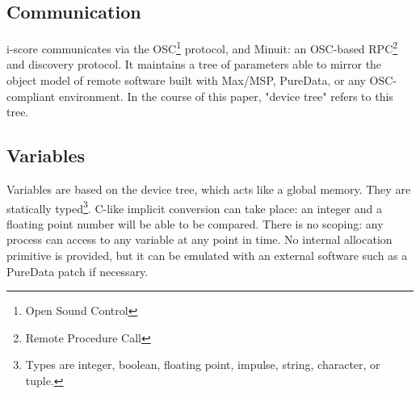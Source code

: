 \documentclass{article}
\begin{document}
\subsection{Communication}
i-score communicates via the OSC\footnote{Open Sound Control} protocol, and Minuit: an OSC-based RPC\footnote{Remote Procedure Call} and discovery protocol.
It maintains a tree of parameters able to mirror the object model of remote software built with Max/MSP, PureData, or any OSC-compliant environment. 
In the course of this paper, "device tree" refers to this tree.

\subsection{Variables}
Variables are based on the device tree, which acts like a global memory. 
They are statically typed\footnote{Types are integer, boolean, floating point, impulse, string, character, or tuple.}. C-like implicit conversion can take place: an integer and a floating point number will be able to be compared.
There is no scoping: any process can access to any variable at any point in time.
No internal allocation primitive is provided, but it can be emulated with an external software such as a PureData patch if necessary.
\end{document}
